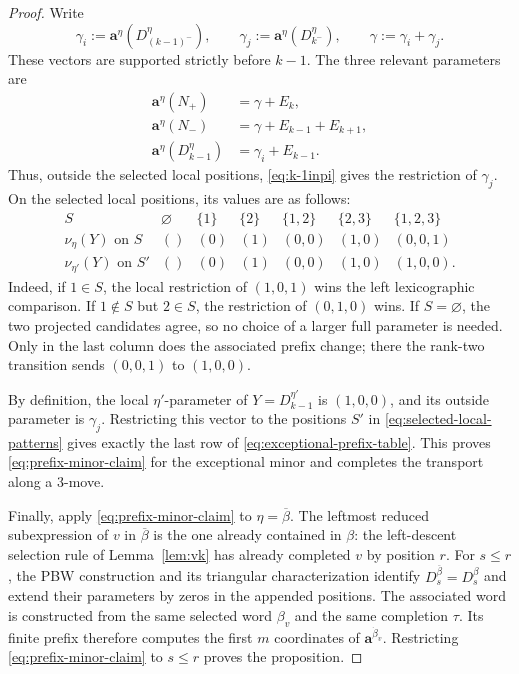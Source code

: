 \documentclass[12pt, reqno]{amsart}
\theoremstyle{plain}
\theoremstyle{definition}
\numberwithin{equation}{section}
\begin{document}
\begin{proof}
Write
\[
    \gamma_i:=\mathbf a^\eta(D_{(k-1)^-}^\eta),\qquad
    \gamma_j:=\mathbf a^\eta(D_{k^-}^\eta),\qquad
    \gamma:=\gamma_i+\gamma_j.
\]
These vectors are supported strictly before $k-1$. The three relevant
parameters are
\begin{align*}
    \mathbf a^\eta(N_+)&=\gamma+E_k,\\
    \mathbf a^\eta(N_-)&=\gamma+E_{k-1}+E_{k+1},\\
    \mathbf a^\eta(D_{k-1}^{\eta})&=\gamma_i+E_{k-1}.
\end{align*}
Thus, outside the selected local positions, \eqref{eq:k-1inpi}
gives the restriction of $\gamma_j$. On the selected local positions,
its values are as follows:
\begin{equation}\label{eq:exceptional-prefix-table}
\begin{array}{c|cccccc}
 S & \varnothing & \{1\} & \{2\} & \{1,2\} & \{2,3\} & \{1,2,3\}\\
 \hline
 \nu_\eta(Y)\text{ on }S
   & () & (0) & (1) & (0,0) & (1,0) & (0,0,1)\\
 \nu_{\eta'}(Y)\text{ on }S'
   & () & (0) & (1) & (0,0) & (1,0) & (1,0,0).
\end{array}
\end{equation}
Indeed, if $1\in S$, the local restriction of $(1,0,1)$ wins the
left lexicographic comparison. If $1\notin S$ but $2\in S$, the
restriction of $(0,1,0)$ wins. If $S=\varnothing$, the two projected
candidates agree, so no choice of a larger full parameter is needed.
Only in the last column does the associated prefix change; there the
rank-two transition sends $(0,0,1)$ to $(1,0,0)$.

By definition, the local $\eta'$-parameter of $Y=D_{k-1}^{\eta'}$ is
$(1,0,0)$, and its outside parameter is $\gamma_j$. Restricting this
vector to the positions $S'$ in \eqref{eq:selected-local-patterns}
gives exactly the last row of \eqref{eq:exceptional-prefix-table}.
This proves \eqref{eq:prefix-minor-claim} for the exceptional minor and
completes the transport along a $3$-move.

Finally, apply \eqref{eq:prefix-minor-claim} to $\eta=\overline\beta$.
The leftmost reduced subexpression of $v$ in $\overline\beta$ is the
one already contained in $\beta$: the left-descent selection rule of
Lemma~\ref{lem:vk} has already completed $v$ by position $r$.
For $s\leq r$, the PBW construction and its triangular characterization
identify $D_s^{\overline\beta}=D_s^\beta$ and extend their parameters
by zeros in the appended positions. The associated word is constructed
from the same selected word $\beta_v$ and the same completion $\tau$.
Its finite prefix therefore computes the first $m$ coordinates of
$\mathbf a^{\dot\beta_v}$. Restricting
\eqref{eq:prefix-minor-claim} to $s\leq r$ proves the proposition.
\end{proof}
\end{document}
